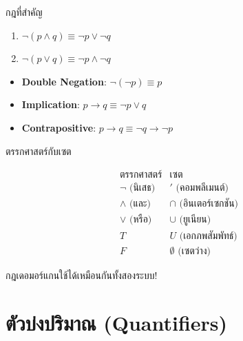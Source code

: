 \documentclass[11pt, aspectratio=169]{beamer}
\begin{document}
\begin{frame}{กฎที่สำคัญ}
  \begin{explanation}
    \begin{enumerate}
      \item $\lnot (p \land q) \equiv \lnot p \lor \lnot q$
      \item $\lnot (p \lor q) \equiv \lnot p \land \lnot q$
    \end{enumerate}
  \end{explanation}

  \begin{explanation}[กฎอื่น ๆ]
    \begin{itemize}
      \item \textbf{Double Negation}: $\lnot (\lnot p) \equiv p$
      \item \textbf{Implication}: $p \to q \equiv \lnot p \lor q$
      \item \textbf{Contrapositive}: $p \to q \equiv \lnot q \to \lnot p$
    \end{itemize}
  \end{explanation}
\end{frame}

\begin{frame}{ตรรกศาสตร์กับเซต}
  \begin{intuition}
    \[
    \begin{array}{c|c}
      \textbf{ตรรกศาสตร์} & \textbf{เซต} \\
      \hline
      \lnot \text{ (นิเสธ)} & ' \text{ (คอมพลีเมนต์)} \\
      \land \text{ (และ)} & \cap \text{ (อินเตอร์เซกชัน)} \\
      \lor \text{ (หรือ)} & \cup \text{ (ยูเนียน)} \\
      T & U \text{ (เอกภพสัมพัทธ์)} \\
      F & \emptyset \text{ (เซตว่าง)}
    \end{array}
    \]

    \medskip
    กฎเดอมอร์แกนใช้ได้เหมือนกันทั้งสองระบบ!
  \end{intuition}
\end{frame}

\section{ตัวบ่งปริมาณ (Quantifiers)}
\end{document}
